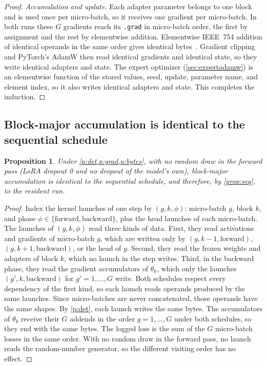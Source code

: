 \documentclass[11pt,letterpaper]{article}
\theoremstyle{definition}
\theoremstyle{plain}
\newtheorem{proposition}{Proposition}
\newcommand{\code}[1]{\texttt{\small #1}}
\newcommand{\G}{G}
\begin{document}
\begin{proof}
\emph{Accumulation and update.}
Each adapter parameter belongs to one block and is used once per
micro-batch, so it receives one gradient per micro-batch.
In both runs these $\G$ gradients reach its \code{.grad} in micro-batch
order, the first by assignment and the rest by elementwise addition.
Elementwise IEEE~754 addition of identical operands in the same order
gives identical bytes~\cite{goldberg1991floating}.
Gradient clipping and PyTorch's AdamW then read identical gradients and identical state, so they write identical adapters and state.
The expert optimizer (\cref{sec:expertadamw}) is an elementwise function of the stored values, seed, update, parameter name, and element index, so it also writes identical adapters and state.
This completes the induction.
\end{proof}

\subsection{Block-major accumulation is identical to the sequential schedule}

\begin{proposition}\label{prop:bm}
Under \cref{p:det,p:grad,p:bytes}, with no random draw in the forward
pass (LoRA dropout 0 and no dropout of the model's own), block-major
accumulation is identical to the sequential schedule, and therefore, by
\cref{prop:seq}, to the resident run.
\end{proposition}

\begin{proof}
Index the kernel launches of one step by $(g,k,\phi)$: micro-batch $g$,
block $k$, and phase $\phi\in\{\text{forward},\text{backward}\}$, plus
the head launches of each micro-batch.
The launches of $(g,k,\phi)$ read three kinds of data.
First, they read activations and gradients of micro-batch $g$, which are
written only by $(g,k-1,\text{forward})$, $(g,k+1,\text{backward})$, or
the head of $g$.
Second, they read the frozen weights and adapters of block $k$, which no
launch in the step writes.
Third, in the backward phase, they read the gradient accumulators of
$\theta_k$, which only the launches $(g',k,\text{backward})$ for
$g'=1,\dots,\G$ write.
Both schedules respect every dependency of the first kind, so each launch
reads operands produced by the same launches.
Since micro-batches are never concatenated, those operands have the same
shapes.
By \cref{p:det}, each launch writes the same bytes.
The accumulators of $\theta_k$ receive their $\G$ addends in the order
$g=1,\dots,\G$ under both schedules, so they end with the same bytes.
The logged loss is the sum of the $\G$ micro-batch losses in the same
order.
With no random draw in the forward pass, no launch reads the
random-number generator, so the different visiting order has no effect.
\end{proof}
\end{document}
